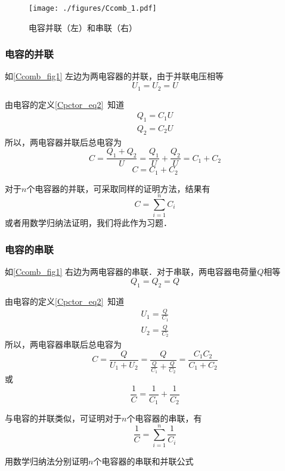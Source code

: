 

\begin{figure}[ht]
\centering
\texttt{[image: ./figures/Ccomb\_1.pdf]}
\caption{电容并联（左）和串联（右）} \label{Ccomb_fig1}
\end{figure}

\subsubsection{电容的并联}
如\autoref{Ccomb_fig1} 左边为两电容器的并联，由于并联电压相等
\begin{equation}
U_1=U_2=U
\end{equation}

由电容的定义\autoref{Cpctor_eq2}~知道
\begin{equation}
\begin{aligned}
Q_1=C_1U\\
Q_2=C_2U
\end{aligned}
\end{equation}
所以，两电容器并联后总电容为
\begin{equation}
C=\frac{Q_1+Q_2}{U}=\frac{Q_1}{U}+\frac{Q_2}{U}=C_1+C_2
\end{equation}
\begin{equation}
C = C_1 + C_2
\end{equation}

对于$n$个电容器的并联，可采取同样的证明方法，结果有
\begin{equation}
C=\sum_{i=1}^{n}C_i
\end{equation}
或者用数学归纳法证明，我们将此作为习题．


\subsubsection{电容的串联}
如\autoref{Ccomb_fig1} 右边为两电容器的串联．对于串联，两电容器电荷量$Q$相等
\begin{equation}
Q_1=Q_2=Q
\end{equation}

由电容的定义\autoref{Cpctor_eq2}~知道
\begin{equation}
\begin{aligned}
U_1=\frac{Q}{C_1}\\
U_2=\frac{Q}{C_2}
\end{aligned}
\end{equation}
所以，两电容器串联后总电容为
\begin{equation}
{C} = \frac{Q}{U_1+U_2} = \frac{Q}{\frac{Q}{C_1}+\frac{Q}{C_2}} = \frac{C_1C_2}{C_1 + C_2}
\end{equation}
或
\begin{equation}
\frac{1}{C}=\frac{1}{C_1}+\frac{1}{C_2}
\end{equation}

与电容的并联类似，可证明对于$n$个电容器的串联，有
\begin{equation}
\frac{1}{C}=\sum_{i=1}^{n}\frac{1}{C_i}
\end{equation}
\begin{exercise}{}
用数学归纳法分别证明$n$个电容器的串联和并联公式
\end{exercise}
